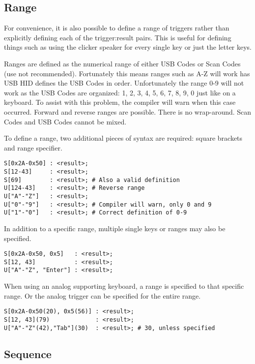 \documentclass{kiibohd-template}
\begin{document}
\subsection{Range}

For convenience, it is also possible to define a range of triggers rather than explicitly defining each of the trigger:result pairs.
This is useful for defining things such as using the clicker speaker for every single key or just the letter keys.

Ranges are defined as the numerical range of either USB Codes or Scan Codes (use not recommended).
Fortunately this means ranges such as A-Z will work has USB HID defines the USB Codes in order.
Unfortunately the range 0-9 will not work as the USB Codes are organized: 1, 2, 3, 4, 5, 6, 7, 8, 9, 0 just like on a keyboard.
To assist with this problem, the compiler will warn when this case occurred.
Forward and reverse ranges are possible.
There is no wrap-around.
Scan Codes and USB Codes cannot be mixed.

To define a range, two additional pieces of syntax are required: square brackets and range specifier.

\begin{lstlisting}
S[0x2A-0x50] : <result>;
S[12-43]     : <result>;
S[69]        : <result>; # Also a valid definition
U[124-43]    : <result>; # Reverse range
U["A"-"Z"]   : <result>;
U["0"-"9"]   : <result>; # Compiler will warn, only 0 and 9
U["1"-"0"]   : <result>; # Correct definition of 0-9
\end{lstlisting}

In addition to a specific range, multiple single keys or ranges may also be specified.

\begin{lstlisting}
S[0x2A-0x50, 0x5]   : <result>;
S[12, 43]           : <result>;
U["A"-"Z", "Enter"] : <result>;
\end{lstlisting}

When using an analog supporting keyboard, a range is specified to that specific range.
Or the analog trigger can be specified for the entire range.

\begin{lstlisting}
S[0x2A-0x50(20), 0x5(56)] : <result>;
S[12, 43](79)             : <result>;
U["A"-"Z"(42),"Tab"](30)  : <result>; # 30, unless specified
\end{lstlisting}


\subsection{Sequence}
\label{subsec:Sequence}
\end{document}
